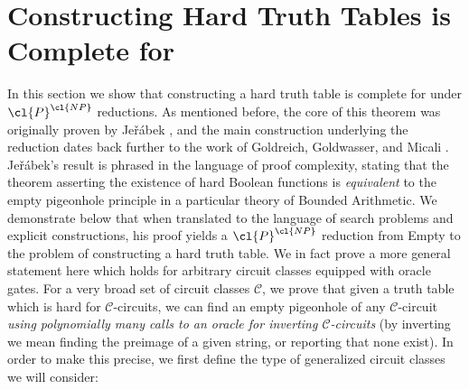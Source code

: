 

\section{Constructing Hard Truth Tables is Complete for }\label{sec:completeness}

In this section we show that constructing a hard truth table is complete for  under $\cl{P}^\cl{NP}$ reductions. As mentioned before, the core of this theorem was originally proven by Je\v{r}\'{a}bek \cite{Jerabek}, and the main construction underlying the reduction dates back further to the work of Goldreich, Goldwasser, and Micali \cite{GGM}.  Je\v{r}\'{a}bek's result is phrased in the language of proof complexity, stating that the theorem asserting the existence of hard Boolean functions is \emph{equivalent} to the empty pigeonhole principle in a particular theory of Bounded Arithmetic. We demonstrate below that when translated to the language of search problems and explicit constructions, his proof yields a $\cl{P}^\cl{NP}$ reduction from {\sc Empty} to the problem of constructing a hard truth table. We in fact prove a more general statement here which holds for arbitrary circuit classes equipped with oracle gates. For a very broad set of circuit classes $\mathcal{C}$, we prove that given a truth table which is hard for $\mathcal{C}$-circuits, we can find an empty pigeonhole of any $\mathcal{C}$-circuit \emph{using polynomially many calls to an oracle for inverting $\mathcal{C}$-circuits} (by inverting we mean finding the preimage of a given string, or reporting that none exist). In order to make this precise, we first define the type of generalized circuit classes we will consider:

